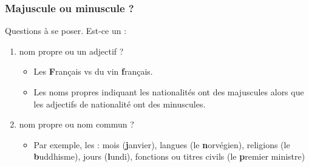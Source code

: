 \documentclass[10pt, french]{article}
\begin{document}
\begin{multicols*}{2}
\subsubsection*{Majuscule ou minuscule ?}
Questions à se poser.
Est-ce un :
\begin{enumerate}
	\item	nom propre ou un adjectif ?
		\begin{itemize}
		\item	Les \textbf{F}rançais vs du vin \textbf{f}rançais.
		\item	Les noms propres indiquant les nationalités ont des majuscules alors que les adjectifs de nationalité ont des minuscules.
		\end{itemize}
	\item	nom propre ou nom commun ?
		\begin{itemize}
		\item	Par exemple, les : mois (\textbf{j}anvier), langues (le \textbf{n}orvégien), religions (le \textbf{b}uddhisme), jours (\textbf{l}undi), fonctions ou titres civils (le \textbf{p}remier ministre)
		\end{itemize}
\end{enumerate}


\end{multicols*}
\end{document}

